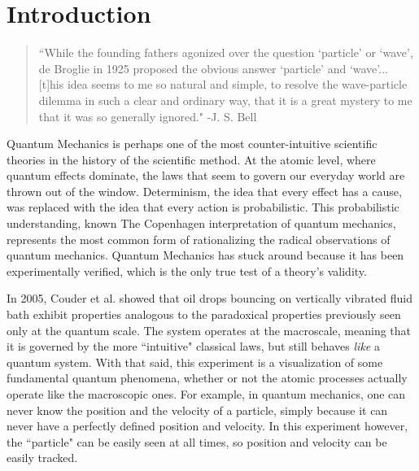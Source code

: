 		
\chapter*{Introduction}
\begin{quote}
	    ``While the founding fathers agonized over the question `particle' or `wave', de Broglie in 1925 proposed the obvious answer `particle' and `wave'... [t]his idea seems to me so natural and simple, to resolve the wave-particle dilemma in such a clear and ordinary way, that it is a great mystery to me that it was so generally ignored." -J. S. Bell
	    \end{quote}
	    

	    


Quantum Mechanics is perhaps one of the most counter-intuitive scientific theories in the history of the scientific method. At the atomic level, where quantum effects dominate, the laws that seem to govern our everyday world are thrown out of the window. Determinism, the idea that every effect has a cause, was replaced with the idea that every action is probabilistic. This probabilistic understanding, known The Copenhagen interpretation of quantum mechanics, represents the most common form of rationalizing the radical observations of quantum mechanics. Quantum Mechanics has stuck around because it has been experimentally verified, which is the only true test of a theory's validity. 

In 2005, Couder et al. showed that oil drops bouncing on vertically vibrated fluid bath exhibit properties analogous to the paradoxical properties previously seen only at the quantum scale.  The system operates at the macroscale, meaning that it is governed by the more ``intuitive" classical laws, but still behaves \textit{like} a quantum system. With that said, this experiment is a visualization of some fundamental quantum phenomena, whether or not the atomic processes actually operate like the macroscopic ones. For example, in quantum mechanics, one can never know the position and the velocity of a particle, simply because it can never have a perfectly defined position and velocity. In this experiment however, the ``particle" can be easily seen at all times, so position and velocity can be easily tracked. 

